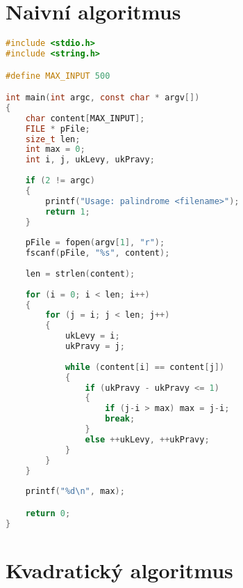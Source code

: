 \documentclass[12pt,a4paper]{article}
\begin{document}

\appendix

\pagebreak

\section{Naivní algoritmus}
\label{prilohaA}

\begin{lstlisting}[language=c]
#include <stdio.h>
#include <string.h>

#define MAX_INPUT 500

int main(int argc, const char * argv[])
{
    char content[MAX_INPUT];
    FILE * pFile;
    size_t len;
    int max = 0; 
    int i, j, ukLevy, ukPravy;
    
    if (2 != argc)
    {
        printf("Usage: palindrome <filename>");
        return 1;
    }
                
    pFile = fopen(argv[1], "r");
    fscanf(pFile, "%s", content);
        
    len = strlen(content);
    
    for (i = 0; i < len; i++)
    {
        for (j = i; j < len; j++)
        {
            ukLevy = i;
            ukPravy = j;
            
            while (content[i] == content[j])
            {
                if (ukPravy - ukPravy <= 1)
                {
                    if (j-i > max) max = j-i;
                    break;
                }
                else ++ukLevy, ++ukPravy;
            }
        }
    }
    
    printf("%d\n", max);

    return 0;
}

\end{lstlisting}

\pagebreak

\section{Kvadratický algoritmus}

\label{kvadraticky}
\end{document}
